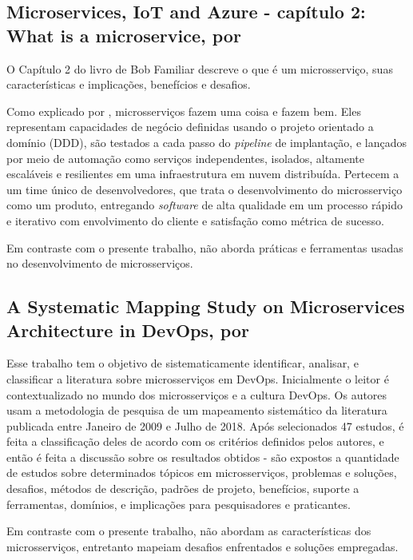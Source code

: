 \subsection{Microservices, IoT and Azure - capítulo 2: What is a microservice, por \texorpdfstring{}{Familiar (2015)}}

O Capítulo 2 do livro de Bob Familiar descreve o que é um microsserviço, suas características e implicações, benefícios e desafios. 

Como explicado por , microsserviços fazem uma coisa e fazem bem. Eles representam capacidades de negócio definidas usando o projeto orientado a domínio (DDD), são testados a cada passo do \emph{pipeline} de implantação, e lançados por meio de automação como serviços independentes, isolados, altamente escaláveis e resilientes em uma infraestrutura em nuvem distribuída. Pertecem a um time único de desenvolvedores, que trata o desenvolvimento do microsserviço como um produto, entregando \emph{software} de alta qualidade em um processo rápido e iterativo com envolvimento do cliente e satisfação como métrica de sucesso.

Em contraste com o presente trabalho,  não aborda práticas e ferramentas usadas no desenvolvimento de microsserviços.

\subsection{A Systematic Mapping Study on Microservices Architecture in DevOps, por \texorpdfstring{}{Waseem, Liang e Shahin (2020)} }

Esse trabalho tem o objetivo de sistematicamente identificar, analisar, e classificar a literatura sobre microsserviços em DevOps. Inicialmente o leitor é contextualizado no mundo dos microsserviços e a cultura DevOps. Os autores usam a metodologia de pesquisa de um mapeamento sistemático da literatura publicada entre Janeiro de 2009 e Julho de 2018. Após selecionados 47 estudos, é feita a classificação deles de acordo com os critérios definidos pelos autores, e então é feita a discussão sobre os resultados obtidos - são expostos a quantidade de estudos sobre determinados tópicos em microsserviços, problemas e soluções, desafios, métodos de descrição, padrões de projeto, benefícios, suporte a ferramentas, domínios, e implicações para pesquisadores e praticantes.

Em contraste com o presente trabalho,  não abordam as características dos microsserviços, entretanto mapeiam desafios enfrentados e soluções
empregadas.

